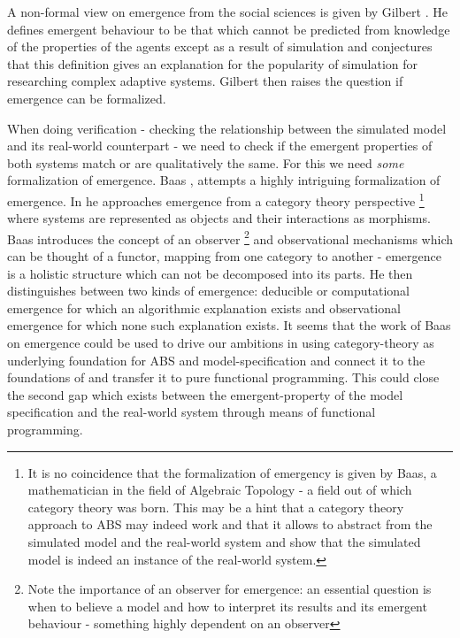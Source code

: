 A non-formal view on emergence from the social sciences is given by Gilbert \cite{gilbert_holism_1996}. He defines emergent behaviour to be that which cannot be predicted from knowledge of the properties of the agents except as a result of simulation and conjectures that this definition gives an explanation for the popularity of simulation for researching complex adaptive systems. Gilbert then raises the question if emergence can be formalized.

When doing verification - checking the relationship between the simulated model and its real-world counterpart - we need to check if the emergent properties of both systems match or are qualitatively the same. For this we need \textit{some} formalization of emergence.
Baas \cite{baas_emergence_1994}, \cite{baas_emergence_1997} attempts a highly intriguing formalization of emergence. In \cite{baas_emergence_1997} he approaches emergence from a category theory perspective \footnote{It is no coincidence that the formalization of emergency is given by Baas, a mathematician in the field of Algebraic Topology - a field out of which category theory was born. This may be a hint that a category theory approach to ABS may indeed work and that it allows to abstract from the simulated model and the real-world system and show that the simulated model is indeed an instance of the real-world system.} where systems are represented as objects and their interactions as morphisms. Baas introduces the concept of an observer \footnote{Note the importance of an observer for emergence: an essential question is when to believe a model and how to interpret its results and its emergent behaviour - something highly dependent on an observer} and observational mechanisms which can be thought of a functor, mapping from one category to another - emergence is a holistic structure which can not be decomposed into its parts. He then distinguishes between two kinds of emergence: deducible or computational emergence for which an algorithmic explanation exists and observational emergence for which none such explanation exists. It seems that the work of Baas on emergence could be used to drive our ambitions in using category-theory as underlying foundation for ABS and model-specification and connect it to the foundations of and transfer it to pure functional programming. This could close the second gap which exists between the emergent-property of the model specification and the real-world system through means of functional programming.